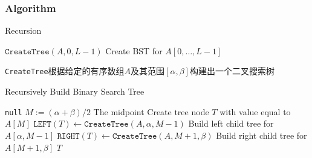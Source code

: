 \subsubsection{Algorithm}
\setcounter{algorithm}{0}
\begin{algorithm}[H]
\caption{Recursion}
\begin{algorithmic}[1]
\State \Return $\texttt{CreateTree}(A, 0, L-1)$ \Comment Create BST for $A[0,\ldots, L-1]$
\EndProcedure
\end{algorithmic}
\end{algorithm}
\begin{CJK*}{UTF8}{gbsn}
\texttt{CreateTree}根据给定的有序数组$A$及其范围$[\alpha, \beta]$构建出一个二叉搜索树
\end{CJK*}
\begin{algorithm}[H]
\caption{Recursively Build Binary Search Tree}
\begin{algorithmic}[1]
\If{$\alpha > \beta$}
\State \Return \texttt{null}
\EndIf
\State $M:=(\alpha+\beta)/2$ \Comment The midpoint
\State Create tree node $T$ with value equal to $A[M]$
\State $\texttt{LEFT}(T)\gets \texttt{CreateTree}(A, \alpha, M-1)$ \Comment Build left child tree for $A[\alpha, M-1]$
\State $\texttt{RIGHT}(T)\gets \texttt{CreateTree}(A, M+1, \beta)$ \Comment Build right child tree for $A[M+1, \beta]$
\State \Return $T$
\EndFunction 
\end{algorithmic}
\end{algorithm}